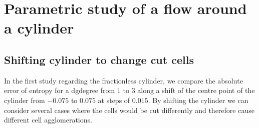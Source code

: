 \section{Parametric study of a flow around a cylinder}

	\subsection{Shifting cylinder to change cut cells}
	In the first study regarding the fractionless cylinder, we compare the absolute error of entropy for a dgdegree from $1$ to $3$ along a shift of the centre point of the cylinder from $-0.075$ to $0.075$ at steps of $0.015$. By shifting the cylinder we can consider several cases where the cells would be cut differently and therefore cause different cell agglomerations.
